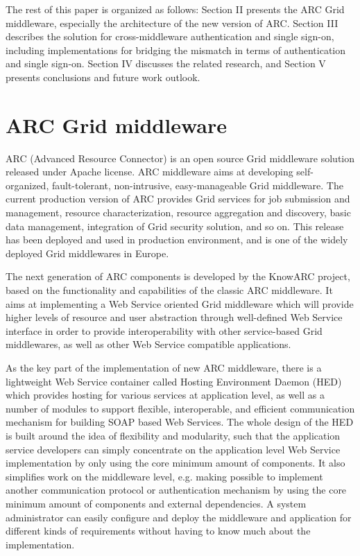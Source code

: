 The rest of this paper is organized as follows: Section II presents the ARC Grid middleware, especially the architecture of the new version of ARC. Section III describes the solution for cross-middleware authentication and single sign-on, including implementations for bridging the mismatch in terms of authentication and single sign-on. Section IV discusses the related research, and Section V presents conclusions and future work outlook.


\section{ARC Grid middleware}
\label{sec:arcmiddleware}
ARC (Advanced Resource Connector) is an open source Grid middleware solution released under Apache license. ARC middleware aims at developing self-organized, fault-tolerant, non-intrusive, easy-manageable Grid middleware\cite{MEllert07}. The current production version of ARC provides Grid services for job submission and management, resource characterization, resource aggregation and discovery, basic data management, integration of Grid security solution, and so on. This release has been deployed and used in production environment, and is one of the widely deployed Grid middlewares in Europe.

The next generation of ARC components is developed by the KnowARC project\cite{KnowARClink}, based on the functionality and capabilities of the classic ARC middleware. It aims at implementing a Web Service oriented Grid middleware which will provide higher levels of resource and user abstraction through well-defined Web Service interface\cite{KnowARCDesignlink} in order to provide interoperability with other service-based Grid middlewares, as well as other Web Service compatible applications.

As the key part of the implementation of new ARC middleware, there is a lightweight Web Service container called Hosting Environment Daemon (HED) which provides hosting for various services at application level, as well as a number of modules to support flexible, interoperable, and efficient communication mechanism for building SOAP based Web Services. The whole design of the HED is built around the idea of flexibility and modularity, such that the application service developers can simply concentrate on the application level Web Service implementation by only using the core minimum amount of components. It also simplifies work on the middleware level, e.g. making possible to implement another communication protocol or authentication mechanism by using the core minimum amount of components and external dependencies. A system administrator can easily configure and deploy the middleware and application for different kinds of requirements without having to know much about the implementation. 

